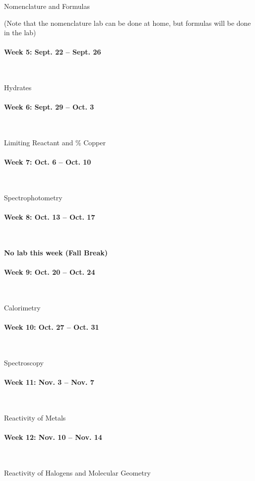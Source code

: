 \documentclass[12pt, letterpaper]{article}
\begin{document}
Nomenclature and Formulas

(Note that the nomenclature lab can be done at home, but formulas will be done in the lab)

\paragraph{Week 5: Sept. 22 -- Sept. 26}~

Hydrates

\paragraph{Week 6: Sept. 29 -- Oct. 3}~

Limiting Reactant and \% Copper

\paragraph{Week 7: Oct. 6 -- Oct. 10}~

Spectrophotometry

\paragraph{Week 8: Oct. 13 -- Oct. 17}~

\textbf{No lab this week (Fall Break)}

\paragraph{Week 9: Oct. 20 -- Oct. 24}~

Calorimetry

\paragraph{Week 10: Oct. 27 -- Oct. 31}~

Spectroscopy

\paragraph{Week 11: Nov. 3 -- Nov. 7}~

Reactivity of Metals

\paragraph{Week 12: Nov. 10 -- Nov. 14}~

Reactivity of Halogens and Molecular Geometry
\end{document}
